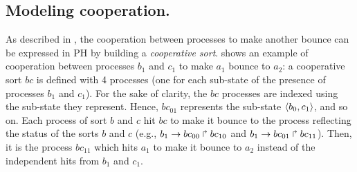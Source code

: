 \begin{comment}
\TBounce{a_1}{}{a_0}{.north east}
;
%
\THit{a_2}{bend right}{b_1}{.north east}{b_0}
\path[bounce, bend left=80]
\TBounce{b_1}{out=100,in=140}{b_0}{.north}
;
\end{tikzpicture}
}
\caption{\label{fig:runningPH-1}
A Process Hitting (PH) example.
Sorts are represented by labeled boxes, and processes by circles (ticks are
the identifiers of the processes within the sort, for instance, $a_0$ is the
process ticked $0$ in the box $a$).
An action (for instance $\PHfrappe{b_1}{a_1}{a_2}$) is represented by a pair of
directed arcs, having the hit part ($b_1$ to $a_1$) in plain line and the bounce
part ($a_1$ to $a_2$) in dotted line.
Actions involving $b_1$ or $c_1$ are in thick lines.
}
\end{figure}

This PH example actually models a BRN where the component $a$ has three qualitative
levels and components $b$ and $c$ are boolean.
In this BRN, $b$ and $c$ activate $a$, while $a$ inhibits $b$.
The inhibition of $b$ by $a$ is only effective when $a$ is at level $2$;
in the other cases, $b$ cannot evolve in any direction.
The activation of $a$ by $b$ ($c$) is encoded by the actions making the level of $a$ increase (resp.
decrease) when $b$ ($c$) is present (resp. absent).
It is worth noticing that the activation of $a$ by $b$ ($c$) is independent from $c$ ($b$).
This may express a lack of knowledge on the cooperation between these two regulators:
we thus model an over-approximation of the possible actions.
\end{example*}
\end{comment}

\subsection{Modeling cooperation.}
As described in \cite{PMR10-TCSB}, the cooperation between processes to make another bounce can be
expressed in PH by building a \emph{cooperative sort}.
 shows an example of cooperation between processes $b_1$ and $c_1$ to
make $a_1$ bounce to $a_2$:
a cooperative sort $bc$ is defined with 4 processes (one for each sub-state of the presence of
processes $b_1$ and $c_1$).
For the sake of clarity, the $bc$ processes are indexed using the sub-state they represent.
Hence, $bc_{01}$ represents the sub-state $\mbox{$\langle b_0,c_1 \rangle$}$, and so on.
Each process of sort $b$ and $c$ hit $bc$ to make it bounce to the process reflecting the status of the sorts $b$
and $c$ (e.g., $b_1\rightarrow bc_{00}\Rsh bc_{10}$ and $b_1\rightarrow bc_{01}\Rsh bc_{11}$).
Then, it is the process $bc_{11}$ which hits $a_1$ to make it bounce to $a_2$ instead of the
independent hits from $b_1$ and $c_1$.

